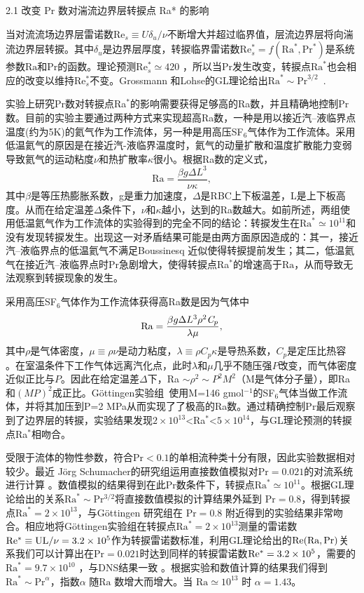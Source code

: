 \documentclass[10pt,aps]{article}
\def\be{\begin{equation}}
\def\ee{\end{equation}}
\def\Ra{\textrm{Ra}}
\def\Pr{\textrm{Pr}}
\begin{document}
{2.1 改变 Pr 数对湍流边界层转捩点 Ra* 的影响 
\vskip 6pt

当对流流场边界层雷诺数Re$_s \equiv U\delta_u/\nu$不断增大并超过临界值，层流边界层将向湍流边界层转捩。其中$\delta_u$是边界层厚度，转捩临界雷诺数Re$_s^*=  f(\Ra^*, \Pr^*)$是系统参数$\Ra$和$\Pr$的函数。理论预测Re$_s^* \simeq 420$ \cite{LL63}，所以当$\Pr$发生改变，转捩点$\Ra^*$也会相应的改变以维持Re$_s^*$不变。Grossmann 和Lohse的GL理论给出$\Ra^* \sim \Pr^{3/2}$~\cite{GL00,GL01}.
\vskip 6pt


实验上研究Pr数对转捩点Ra$^*$的影响需要获得足够高的Ra数，并且精确地控制Pr数。目前的实验主要通过两种方式来实现超高Ra数，一种是用以接近汽–液临界点温度(约为5K)的氦气作为工作流体，另一种是用高压SF$_6$气体作为工作流体。采用低温氦气的原因是在接近汽-液临界温度时，氦气的动量扩散和温度扩散能力变弱导致氦气的运动粘度$\nu$和热扩散率$\kappa$很小。根据Ra数的定义式，
\be
 \Ra=\frac{\beta g\Delta L^3  }{\nu\kappa} ,
\ee
其中$\beta$是等压热膨胀系数，g是重力加速度，$\Delta $是RBC上下板温差，L是上下板高度。从而在给定温差$\Delta$条件下，$\nu$和$\kappa$越小，达到的Ra数越大。如前所述，两组使用低温氦气作为工作流体的实验得到的完全不同的结论：转捩发生在$\Ra^*\simeq 10^{11}$\cite{CCCHCC97,CCCCH01}和没有发现转捩发生\cite{NSSD00}。出现这一对矛盾结果可能是由两方面原因造成的：其一，接近汽–液临界点的低温氦气不满足Boussinesq 近似使得转捩提前发生；其二，低温氦气在接近汽–液临界点时Pr急剧增大，使得转捩点Ra$^*$的增速高于$\Ra$，从而导致无法观察到转捩现象的发生。
\vskip 6pt



采用高压SF$_6$气体作为工作流体获得高Ra数是因为气体中
\be
\Ra=\frac{\beta g\Delta L^3 \rho^2 \emph C_p}{\lambda\mu} ,
\ee
其中$\rho$是气体密度，$\mu \equiv \rho\nu$是动力粘度，$\lambda \equiv \rho C_p \kappa$是导热系数，$C_p$是定压比热容 \cite{AFB09}。在室温条件下工作气体远离汽化点，此时$\lambda$和$\mu$几乎不随压强$P$改变，而气体密度近似正比与$P$。因此在给定温差$\Delta$下，Ra $\sim\rho^2\sim P^2 M^2$（M是气体分子量），即Ra和$(MP)^2$成正比。Göttingen实验组~\cite{HFBA12}使用M=146 gmol$^{-1}$的SF$_6$气体当做工作流体，并将其加压到P=2 MPa从而实现了了极高的Ra数。通过精确控制Pr最后观察到了边界层的转捩，实验结果发现$2\times10^{13}$<Ra$^*$<$5 \times 10^{14}$，与GL理论预测的转捩点Ra$^*$相吻合。
\vskip 6pt



受限于流体的物性参数，符合$\Pr < 0.1$的单相流种类十分有限，因此实验数据相对较少。最近 Jörg Schumacher的研究组运用直接数值模拟对$\Pr=0.021$的对流系统进行计算 \cite{SBPS16}。数值模拟的结果得到在此$\Pr$数条件下，转捩点$\Ra^* \simeq 10^{11}$。根据GL理论给出的关系$\Ra^* \sim $Pr$^{3/2}$将直接数值模拟的计算结果外延到 $\Pr = 0.8$，得到转捩点$\Ra^* = 2 \times 10^{13}$，与G\"ottingen 研究组在 $\Pr = 0.8$ 附近得到的实验结果非常吻合。相应地将G\"ottingen实验组在转捩点$\Ra^* = 2\times 10^{13}$测量的雷诺数$\rm{Re^*} \equiv UL/\nu = 3.2 \times 10^5$作为转捩雷诺数标准，利用GL理论给出的$\rm{Re}(\Ra,\Pr)$关系我们可以计算出在$\Pr = 0.021$时达到同样的转捩雷诺数$\rm{Re^*} = 3.2 \times 10^5$，需要的$\Ra^* = 9.7 \times 10^{10}$ \cite{ABH17}，与DNS结果一致 。根据实验和数值计算的结果我们得到 $\Ra^* \sim \Pr^\alpha$，指数$\alpha$ 随$\Ra$ 数增大而增大。当 $\Ra \simeq 10^{13}$ 时 $\alpha = 1.43$。\\



}
\end{document}
